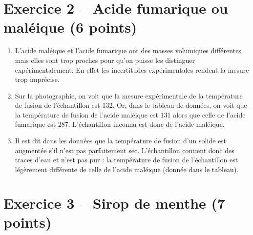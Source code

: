 \section*{Exercice 2 -- Acide fumarique ou maléique (6 points)}

\begin{enumerate}
\item L'acide maléique et l'acide fumarique ont des masses volumiques différentes mais elles sont trop proches pour qu'on puisse les distinguer expérimentalement.
En effet les incertitudes expérimentales rendent la mesure trop imprécise.
\item Sur la photographie, on voit que la mesure expérimentale de la température de fusion de l'échantillon est \unit{132}{\celsius}.
Or, dans le tableau de données, on voit que la température de fusion de l'acide maléique est \unit{131}{\celsius} alors que celle de l'acide fumarique est \unit{287}{\celsius}.
L'échantillon inconnu est donc de l'acide maléique.
\item Il est dit dans les données que la température de fusion d'un solide est augmentée s'il n'est pas parfaitement sec.
L'échantillon contient donc des traces d'eau et n'est pas pur : la température de fusion de l'échantillon est légèrement différente de celle de l'acide maléique (donnée dans le tableau).
\end{enumerate}

\section*{Exercice 3 -- Sirop de menthe (7 points)}

